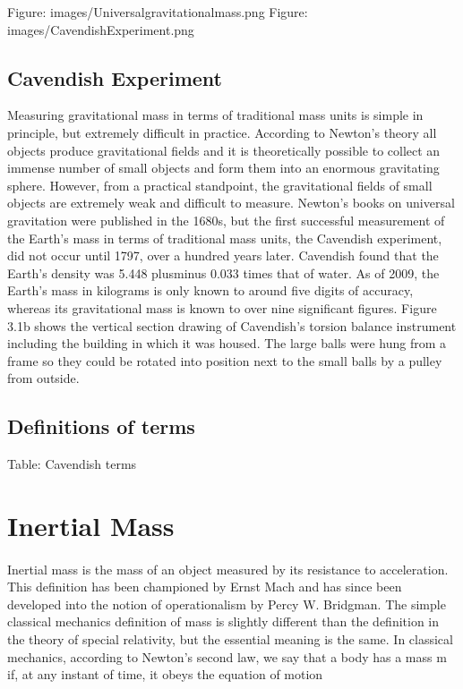 \documentclass{book}
\begin{document}
	Figure: images/Universalgravitationalmass.png
	Figure: images/CavendishExperiment.png
	
	\subsection{Cavendish Experiment}
	Measuring gravitational mass in terms of traditional mass units is simple in principle, but extremely difficult in practice. According to Newton's theory all objects produce gravitational fields and it is theoretically possible to collect an immense number of small objects and form them into an enormous gravitating sphere. However, from a practical standpoint, the gravitational fields of small objects are extremely weak and difficult to measure. Newton's books on universal gravitation were published in the 1680s, but the first successful measurement of the Earth's mass in terms of traditional mass units, the Cavendish experiment, did not occur until 1797, over a hundred years later. Cavendish found that the Earth's density was 5.448 plusminus 0.033 times that of water. As of 2009, the Earth's mass in kilograms is only known to around five digits of accuracy, whereas its gravitational mass is known to over nine significant figures.  Figure 3.1b shows the vertical section drawing of Cavendish's torsion balance instrument including the building in which it was housed. The large balls were hung from a frame so they could be rotated into position next to the small balls by a pulley from outside.
	
	\subsection{Definitions of terms}
	Table: Cavendish terms
	
	\section{Inertial Mass}
	\paragraph{}
	Inertial mass is the mass of an object measured by its resistance to acceleration. This definition has been championed by Ernst Mach and has since been developed into the notion of operationalism by Percy W. Bridgman. The simple classical mechanics definition of mass is slightly different than the definition in the theory of special relativity, but the essential meaning is the same. In classical mechanics, according to Newton's second law, we say that a body has a mass m if, at any instant of time, it obeys the equation of motion
	
\end{document}
